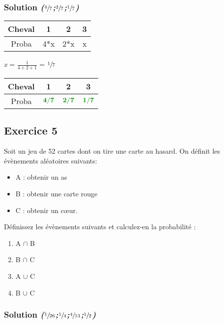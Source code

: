 \documentclass[french]{article}
\begin{document}
\subsubsection{Solution \emph{(\(\sfrac{4}{7}\);\(\sfrac{2}{7}\);\(\sfrac{1}{7}\))}}
\label{sec:org5bcfe7a}

\begin{center}
\begin{tabular}{|c|c|c|c|}
\hline
Cheval & 1 & 2 & 3\\
\hline
Proba & 4*x & 2*x & x\\
\hline
\end{tabular}
\end{center}
\begin{center}
\emph{x} = \(\frac{1}{4+2+1}\) = \(\sfrac{1}{7}\)
\end{center}
\begin{center}
\begin{tabular}{|c|c|c|c|}
\hline
Cheval & 1 & 2 & 3\\
\hline
Proba & \(\textcolor{luckydarkgreen}{\bold{4/7}}\) & \(\textcolor{luckydarkgreen}{\bold{2/7}}\) & \(\textcolor{luckydarkgreen}{\bold{1/7}}\)\\
\hline
\end{tabular}
\end{center}

\subsection{Exercice 5}
\label{sec:org0d3aeeb}

Soit un jeu de 52 cartes dont on tire une carte au hasard. On définit les évènements aléatoires suivants:
\begin{itemize}
\item A : obtenir un as
\item B : obtenir une carte rouge
\item C : obtenir un cœur.
\end{itemize}

Définissez les évènements suivants et calculez-en la probabilité :
\begin{enumerate}
\item A \(\cap\) B
\item B \(\cap\) C
\item A \(\cup\) C
\item B \(\cup\) C
\end{enumerate}

\subsubsection{Solution \emph{(\(\sfrac{1}{26}\);\(\sfrac{1}{4}\);\(\sfrac{4}{13}\);\(\sfrac{1}{2}\))}}
\label{sec:orgc34b655}
\end{document}
